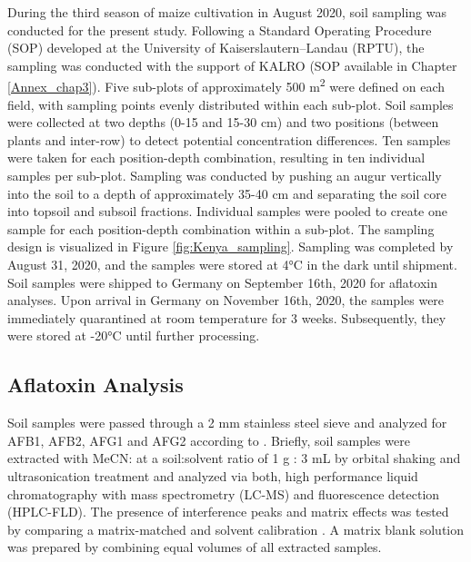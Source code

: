 \begin{refsection}
During the third season of maize cultivation in August 2020, soil sampling was conducted for the present study. Following a Standard Operating Procedure (SOP) developed at the University of Kaiserslautern--Landau (RPTU), the sampling was conducted with the support of KALRO (SOP available in Chapter \ref{Annex_chap3}). Five sub-plots of approximately 500 m\textsuperscript{2} were defined on each field, with sampling points evenly distributed within each sub-plot. Soil samples were collected at two depths (0-15 and 15-30 cm) and two positions (between plants and inter-row) to detect potential concentration differences. Ten samples were taken for each position-depth combination, resulting in ten individual samples per sub-plot. Sampling was conducted by pushing an augur vertically into the soil to a depth of approximately 35-40 cm and separating the soil core into topsoil and subsoil fractions. Individual samples were pooled to create one sample for each position-depth combination within a sub-plot. The sampling design is visualized in Figure \ref{fig:Kenya_sampling}. Sampling was completed by August 31, 2020, and the samples were stored at 4°C in the dark until shipment. Soil samples were shipped to Germany on September 16th, 2020 for aflatoxin analyses. Upon arrival in Germany on November 16th, 2020, the samples were immediately quarantined at room temperature for 3 weeks. Subsequently, they were stored at -20°C until further processing.


\subsection{Aflatoxin Analysis}

Soil samples were passed through a 2 mm stainless steel sieve and analyzed for AFB1, AFB2, AFG1 and AFG2 according to \citet{albert2021validation}. Briefly, soil samples were extracted with MeCN: at a soil:solvent ratio of 1 g : 3 mL by orbital shaking and ultrasonication treatment and analyzed via both, high performance liquid chromatography with mass spectrometry (LC-MS) and fluorescence detection (HPLC-FLD). The presence of interference peaks and matrix effects was tested by comparing a matrix-matched and solvent calibration \citep{albert2021validation}. A matrix blank solution was prepared by combining equal volumes of all extracted samples.


\end{refsection}
